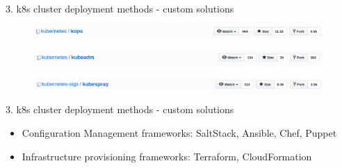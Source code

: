 \documentclass{beamer}
\begin{document}
\begin{frame}{3. k8s cluster deployment methods - custom solutions}%
\begin{figure}
	\includegraphics[width=11cm]{figures/custom-kops.png}
	\label{fig:custom-kops}
\end{figure}
\begin{figure}
	\includegraphics[width=11cm]{figures/custom-kubeadm.png}
	\label{fig:custom-kubeadm}
\end{figure}
\begin{figure}
	\includegraphics[width=11cm]{figures/custom-kubespray.png}
	\label{fig:custom-kubespray}
\end{figure}
\end{frame}


\begin{frame}{3. k8s cluster deployment methods - custom solutions}%
\begin{itemize}
	\item Configuration Management frameworks: SaltStack, Ansible, Chef, Puppet
	\item Infrastructure provisioning frameworks: Terraform, CloudFormation
\end{itemize}
\end{frame}
\end{document}
